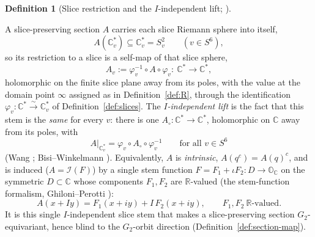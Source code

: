 \documentclass[11pt]{article}
\newcommand{\OO}{\mathbb{O}}
\newcommand{\CC}{\mathbb{C}}
\newcommand{\RR}{\mathbb{R}}
\newcommand{\Cstar}{\CC^{*}}
\providecommand{\Gtwo}{G_2}
\providecommand{\lean}[1]{}
\theoremstyle{plain}
\theoremstyle{definition}
\newtheorem{definition}[theorem]{Definition}
\theoremstyle{remark}
\begin{document}
\begin{definition}[Slice restriction and the $I$-independent lift; ]\label{def:slice-squares}
\lean{IsIntrinsic, ASection.realize, ASection.realize_mem_sliceSphere,
ASection.realize_equivariant}
A slice-preserving section $A$ carries each slice Riemann sphere into itself,
\[
  A(\CC_v^{*})\subseteq\CC_v^{*}=S^2_v\qquad(v\in S^6),
\]
so its restriction to a slice is a self-map of that slice sphere,
\[
  A_v:=\varphi_v^{-1}\circ A\circ\varphi_v:\ \Cstar\longrightarrow\Cstar,
\]
holomorphic on the finite slice plane away from its poles, with the value at the domain point
$\infty$ assigned as in Definition~\ref{def:R}, through the identification
$\varphi_v:\Cstar\xrightarrow{\sim}\CC_v^{*}$ of Definition~\ref{def:slices}. The
\emph{$I$-independent lift} is the fact that this stem is the \emph{same} for every $v$: there is
one $A_\circ:\Cstar\to\Cstar$, holomorphic on $\CC$ away from its poles, with
\[
  A|_{\CC_v^{*}}=\varphi_v\circ A_\circ\circ\varphi_v^{-1}\qquad\text{for all }v\in S^6
\]
(Wang \cite[Rem.~2.11]{Wang}; Bisi--Winkelmann \cite[\S3.7]{BisiWinkelmann}). Equivalently, $A$ is
\emph{intrinsic}, $A(q^c)=A(q)^c$, and is induced ($A=\mathcal I(F)$) by a single stem function
$F=F_1+\iota F_2:D\to\OO_{\CC}$ on the symmetric $D\subset\CC$ whose components $F_1,F_2$ are
$\RR$-valued (the stem-function formalism, Ghiloni--Perotti \cite[Def.~2.1, Prop.~2.2]{SeriesExp}):
\[
  A(x+Iy)=F_1(x+iy)+I\,F_2(x+iy),\qquad F_1,F_2\ \RR\text{-valued}.
\]
It is this single $I$-independent slice stem that makes a slice-preserving section
$\Gtwo$-equivariant, hence blind to the $\Gtwo$-orbit direction
(Definition~\ref{def:section-map}).
\end{definition}
\end{document}
